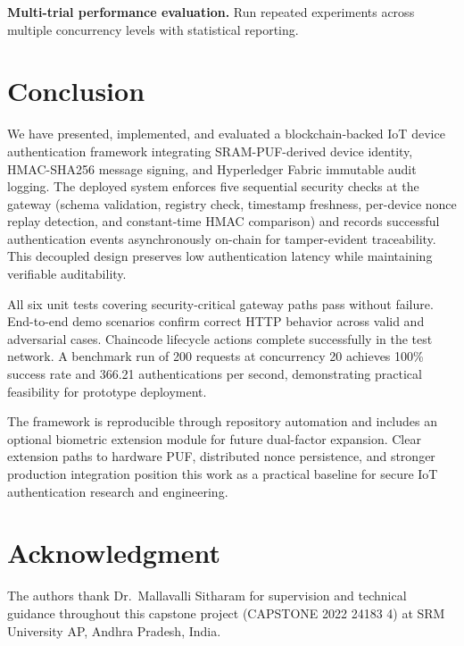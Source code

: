 \documentclass[conference]{IEEEtran}
\begin{document}
\textbf{Multi-trial performance evaluation.} Run repeated experiments across multiple concurrency levels with statistical reporting.

\section{Conclusion}
\label{sec:conclusion}

We have presented, implemented, and evaluated a blockchain-backed IoT device authentication framework integrating SRAM-PUF-derived device identity, HMAC-SHA256 message signing, and Hyperledger Fabric immutable audit logging. The deployed system enforces five sequential security checks at the gateway (schema validation, registry check, timestamp freshness, per-device nonce replay detection, and constant-time HMAC comparison) and records successful authentication events asynchronously on-chain for tamper-evident traceability. This decoupled design preserves low authentication latency while maintaining verifiable auditability.

All six unit tests covering security-critical gateway paths pass without failure. End-to-end demo scenarios confirm correct HTTP behavior across valid and adversarial cases. Chaincode lifecycle actions complete successfully in the test network. A benchmark run of 200 requests at concurrency 20 achieves 100\% success rate and 366.21 authentications per second, demonstrating practical feasibility for prototype deployment.

The framework is reproducible through repository automation and includes an optional biometric extension module for future dual-factor expansion. Clear extension paths to hardware PUF, distributed nonce persistence, and stronger production integration position this work as a practical baseline for secure IoT authentication research and engineering.

\section*{Acknowledgment}

The authors thank Dr.\ Mallavalli Sitharam for supervision and technical guidance throughout this capstone project (CAPSTONE 2022 24183 4) at SRM University AP, Andhra Pradesh, India.
\end{document}

